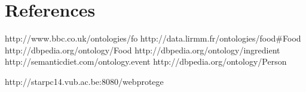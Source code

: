 \section*{References}
http://www.bbc.co.uk/ontologies/fo\newline
http://data.lirmm.fr/ontologies/food\#Food\newline
http://dbpedia.org/ontology/Food \newline
http://dbpedia.org/ontology/ingredient\newline
http://semanticdiet.com/ontology.event \newline
http://dbpedia.org/ontology/Person \newline


http://starpc14.vub.ac.be:8080/webprotege

